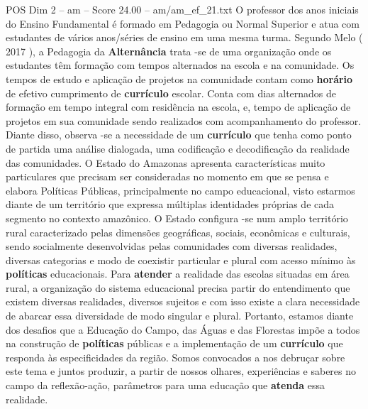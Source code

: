 \begin{textsample}{POS Dim 2 – am – Score 24.00 – am/am\_ef\_21.txt}
O professor dos anos iniciais do Ensino Fundamental é formado em Pedagogia ou Normal Superior e atua com estudantes de vários anos/séries de ensino em uma mesma turma.
Segundo Melo ( 2017 ), a Pedagogia da \textbf{Alternância} trata -se de uma organização onde os estudantes têm formação com tempos alternados na escola e na comunidade.
Os tempos de estudo e aplicação de projetos na comunidade contam como \textbf{horário} de efetivo cumprimento de \textbf{currículo} escolar.
Conta com dias alternados de formação em tempo integral com residência na escola, e, tempo de aplicação de projetos em sua comunidade sendo realizados com acompanhamento do professor.
Diante disso, observa -se a necessidade de um \textbf{currículo} que tenha como ponto de partida uma análise dialogada, uma codificação e decodificação da realidade das comunidades.
O Estado do Amazonas apresenta características muito particulares que precisam ser consideradas no momento em que se pensa e elabora Políticas Públicas, principalmente no campo educacional, visto estarmos diante de um território que expressa múltiplas identidades próprias de cada segmento no contexto amazônico.
O Estado configura -se num amplo território rural caracterizado pelas dimensões geográficas, sociais, econômicas e culturais, sendo socialmente desenvolvidas pelas comunidades com diversas realidades, diversas categorias e modo de coexistir particular e plural com acesso mínimo às \textbf{políticas} educacionais.
Para \textbf{atender} a realidade das escolas situadas em área rural, a organização do sistema educacional precisa partir do entendimento que existem diversas realidades, diversos sujeitos e com isso existe a clara necessidade de abarcar essa diversidade de modo singular e plural.
Portanto, estamos diante dos desafios que a Educação do Campo, das Águas e das Florestas impõe a todos na construção de \textbf{políticas} públicas e a implementação de um \textbf{currículo} que responda às especificidades da região.
Somos convocados a nos debruçar sobre este tema e juntos produzir, a partir de nossos olhares, experiências e saberes no campo da reflexão-ação, parâmetros para uma educação que \textbf{atenda} essa realidade.

\end{textsample}
